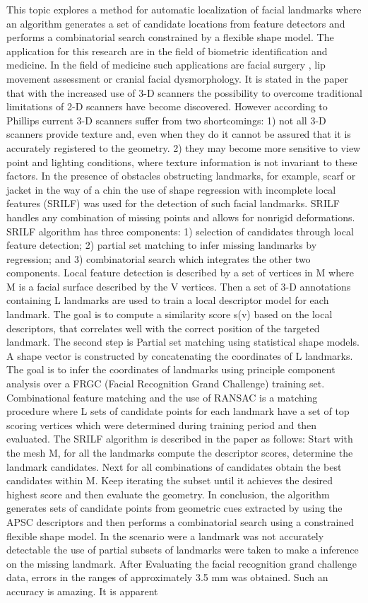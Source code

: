 \documentclass[12pt]{article} %
\begin{document}
This topic explores a method for automatic localization of facial landmarks where an algorithm generates a set of candidate locations from feature detectors and performs a combinatorial search constrained by a flexible shape model. The application for this research are in the field of biometric identification and medicine. In the field of medicine such applications are facial surgery \cite{Sharifi}, lip movement assessment \cite{Popat} or cranial facial dysmorphology. It is stated in the paper that with the increased use of 3-D scanners the possibility to overcome traditional limitations of 2-D scanners have become discovered. However according to Phillips current 3-D scanners suffer from two shortcomings: 1) not all 3-D scanners provide texture and, even when they do it cannot be assured that it is accurately registered to the geometry. 2) they may become more sensitive to view point and lighting conditions, where texture information is not invariant to these factors. \cite{Phillips} In the presence of obstacles obstructing landmarks, for example, scarf or jacket in the way of a chin the use of shape regression with incomplete local features (SRILF) was used for the detection of such facial landmarks. SRILF handles any combination of missing points and allows for nonrigid deformations. SRILF algorithm has three components: 1) selection of candidates through local feature detection; 2) partial set matching to infer missing landmarks by regression; and 3) combinatorial search which integrates the other two components. Local feature detection is described by a set of vertices in M where M is a facial surface described by the V vertices. Then a set of 3-D annotations containing L landmarks are used to train a local descriptor model for each landmark. The goal is to compute a similarity score s(v) based on the local descriptors, that correlates well with the correct position of the targeted landmark. The second step is Partial set matching using statistical shape models. A shape vector is constructed by concatenating the coordinates of L landmarks. The goal is to infer the coordinates of landmarks using principle component analysis over a FRGC (Facial Recognition Grand Challenge) training set. Combinational feature matching and the use of RANSAC is a matching procedure where L sets of candidate points for each landmark have a set of top scoring vertices which were determined during training period and then evaluated. The SRILF algorithm is described in the paper as follows: Start with the mesh M, for all the landmarks compute the descriptor scores, determine the landmark candidates. Next for all combinations of candidates obtain the best candidates within M. Keep iterating the subset until it achieves the desired highest score and then evaluate the geometry. In conclusion, the algorithm generates sets of candidate points from geometric cues extracted by using the APSC descriptors and then performs a combinatorial search using a constrained flexible shape model. In the scenario were a landmark was not accurately detectable the use of partial subsets of landmarks were taken to make a inference on the missing landmark. After Evaluating the facial recognition grand challenge data, errors in the ranges of approximately 3.5 mm was obtained. Such an accuracy is amazing. It is apparent 
\end{document}
